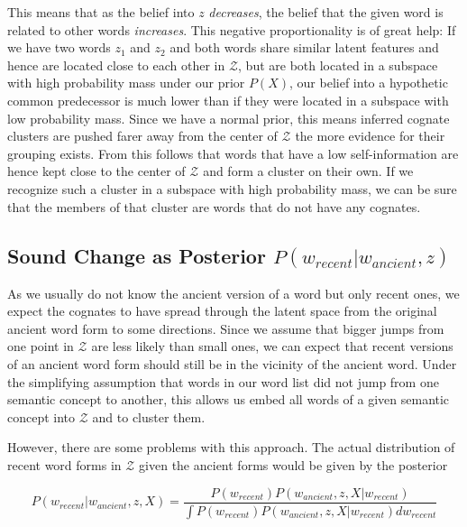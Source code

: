 \documentclass[6pt]{article}
\begin{document}
This means that as the belief into $z$ \textit{decreases}, the belief that the given word is related to other words \textit{increases}. This negative proportionality is of great help: If we have two words $z_1$ and $z_2$ and both words share similar latent features and hence are located close to each other in $\mathcal{Z}$, but are both located in a subspace with high probability mass under our prior $P(X)$, our belief into a hypothetic common predecessor is much lower than if they were located in a subspace with low probability mass. Since we have a normal prior, this means inferred cognate clusters are pushed farer away from the center of $\mathcal{Z}$ the more evidence for their grouping exists. From this follows that words that have a low self-information are hence kept close to the center of $\mathcal{Z}$ and form a cluster on their own. If we recognize such a cluster in a subspace with high probability mass, we can be sure that the members of that cluster are words that do not have any cognates.
 



\subsection{Sound Change as Posterior $P(w_{recent}|w_{ancient},z)$ }


As we usually do not know the ancient version of a word but only recent ones, we expect the cognates to have spread through the latent space from the original ancient word form to some directions. Since we assume that bigger jumps from one point in $\mathcal{Z}$ are less likely than small ones, we can expect that recent versions of an ancient word form should still be in the vicinity of the ancient word. Under the simplifying assumption that words in our word list did not jump from one semantic concept to another, this allows us embed all words of a given semantic concept into $\mathcal{Z}$ and to cluster them.

However, there are some problems with this approach.
The actual distribution of recent word forms in $\mathcal{Z}$ given the ancient forms would be given by the posterior

\begin{equation}
P(w_{recent}|w_{ancient},z,X) = \frac{P(w_{recent})P(w_{ancient},z,X|w_{recent})}{\int P(w_{recent})P(w_{ancient},z,X|w_{recent})dw_{recent}}
\end{equation}
\end{document}
